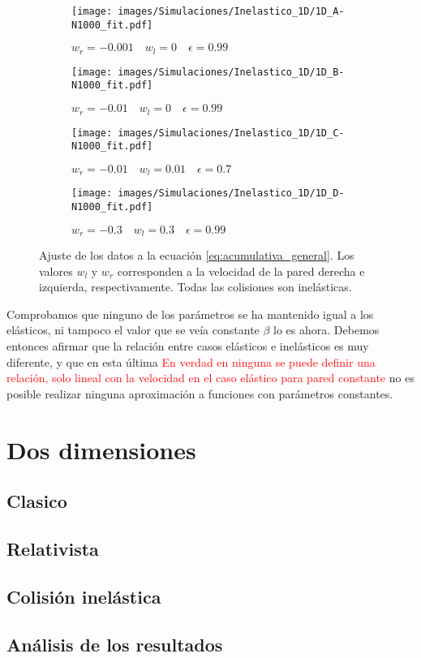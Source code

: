 \documentclass[11pt, spanish]{book}
\begin{document}
\begin{figure}[H]
    \begin{subfigure}[b]{0.5\textwidth}
        \centering
        \texttt{[image: images/Simulaciones/Inelastico\_1D/1D\_A-N1000\_fit.pdf]}
        \caption{$w_r = -0.001 \quad w_l = 0 \quad \epsilon = 0.99$}
    \end{subfigure}
    \hfill
    \begin{subfigure}[b]{0.5\textwidth}
        \centering
        \texttt{[image: images/Simulaciones/Inelastico\_1D/1D\_B-N1000\_fit.pdf]}
        \caption{$w_r = -0.01 \quad w_l = 0 \quad \epsilon = 0.99$}
    \end{subfigure}
    \hfill
    \begin{subfigure}[b]{0.5\textwidth}
        \centering
        \texttt{[image: images/Simulaciones/Inelastico\_1D/1D\_C-N1000\_fit.pdf]}
        \caption{$w_r = -0.01 \quad w_l = 0.01 \quad \epsilon = 0.7$}
    \end{subfigure}
    \hfill
    \begin{subfigure}[b]{0.5\textwidth}
        \centering
        \texttt{[image: images/Simulaciones/Inelastico\_1D/1D\_D-N1000\_fit.pdf]}
        \caption{$w_r = -0.3 \quad w_l = 0.3 \quad \epsilon = 0.99$}
    \end{subfigure}
    \caption{Ajuste de los datos a la ecuación \ref{eq:acumulativa_general}. Los valores \( w_l \) y \( w_r \) corresponden a la velocidad de la pared derecha e izquierda, respectivamente. Todas las colisiones son  inelásticas.}
    \label{fig:ajuste_1D_inelastic}
\end{figure}

\vspace{3mm}

Comprobamos que ninguno de los parámetros se ha mantenido igual a los elásticos, ni tampoco el valor que se veía constante \( \beta \) lo es ahora. Debemos entonces afirmar que la relación entre casos elásticos e inelásticos es muy diferente, y que en esta última \textcolor{red}{En verdad en ninguna se puede definir una relación, solo lineal con la velocidad en el caso elástico para pared constante} no es posible realizar ninguna aproximación a funciones con parámetros constantes. 


\section{Dos dimensiones}

\subsection{Clasico}

\subsection{Relativista}

\subsection{Colisión inelástica}

\subsection{Análisis de los resultados}
\end{document}
